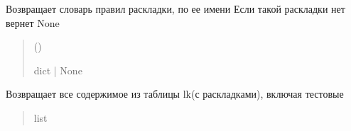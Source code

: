 \documentclass[a4paper,11pt,russian,openany,oneside]{sphinxmanual}
\begin{document}
\begin{savenotes}\begin{fulllineitems}
\label{\detokenize{_autosummary/database_module.database:database_module.database.take_lk_from_db}}
\pysigstartsignatures
\pysiglinewithargsret
{}
{}
{}
\pysigstopsignatures
\sphinxAtStartPar
Возвращает словарь правил раскладки, по ее имени
Если такой раскладки нет \sphinxhyphen{} вернет None
\begin{quote}\begin{description}
\sphinxAtStartPar
{} ()

\sphinxAtStartPar
dict | None

\end{description}\end{quote}

\end{fulllineitems}\end{savenotes}


\begin{savenotes}\begin{fulllineitems}
\label{\detokenize{_autosummary/database_module.database:database_module.database.take_all_data_from_lk}}
\pysigstartsignatures
\pysiglinewithargsret
{}
{}
{}
\pysigstopsignatures
\sphinxAtStartPar
Возвращает все содержимое из таблицы lk(с раскладками), включая тестовые
\begin{quote}\begin{description}
\sphinxAtStartPar
list

\end{description}\end{quote}

\end{fulllineitems}\end{savenotes}

\end{document}
